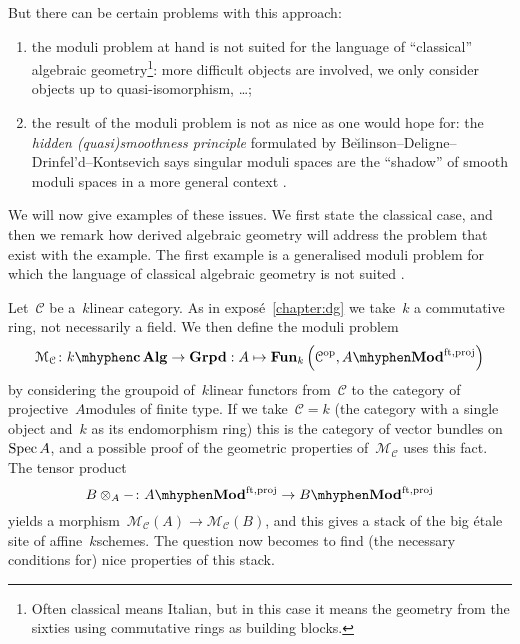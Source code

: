 \begin{refsection}
But there can be certain problems with this approach:
\begin{enumerate}
  \item the moduli problem at hand is not suited for the language of ``classical'' algebraic geometry\footnote{Often classical means Italian, but in this case it means the geometry from the sixties using commutative rings as building blocks.}: more difficult objects are involved, we only consider objects up to quasi-isomorphism, \dots;
  \item the result of the moduli problem is not as nice as one would hope for: the \emph{hidden (quasi)smooth\-ness principle} formulated by Be\u\i linson--Deligne--Drinfel'd--Kontsevich says singular moduli spaces are the ``shadow'' of smooth moduli spaces in a more general context \cite[sections 1.4 and 5.1]{kontsevich-enumeration-of-rational-curves}.
\end{enumerate}
We will now give examples of these issues. We first state the classical case, and then we remark how derived algebraic geometry will address the problem that exist with the example. The first example is a generalised moduli problem for which the language of classical algebraic geometry is not suited \cite[section 1]{toen-vaquie-moduli-of-objects-in-dg-categories}.
\begin{example}
  Let~$\mathcal{C}$ be a~$k$\dash linear category. As in expos\'e~\ref{chapter:dg} we take~$k$ a commutative ring, not necessarily a field. We then define the moduli problem
  \begin{equation}
    \label{equation:moduli-linear-category}
    \mathcal{M}_{\mathcal{C}}\colon k\mhyphen\mathbf{c\,Alg}\to\mathbf{Grpd}:A\mapsto\Fun_k\left( \mathcal{C}^\opp,A\mhyphen\Mod^{\mathrm{ft,proj}} \right)
  \end{equation}
  by considering the groupoid of~$k$\dash linear functors from~$\mathcal{C}$ to the category of projective~$A$\dash modules of finite type. If we take~$\mathcal{C}=k$ (the category with a single object and~$k$ as its endomorphism ring) this is the category of vector bundles on~$\operatorname{Spec} A$, and a possible proof of the geometric properties of~$\mathcal{M}_{\mathcal{C}}$ uses this fact. The tensor product
  \begin{equation}
    B\otimes_A-\colon A\mhyphen\Mod^{\mathrm{ft,proj}}\to B\mhyphen\Mod^{\mathrm{ft,proj}}
  \end{equation}
  yields a morphism~$\mathcal{M}_{\mathcal{C}}(A)\to\mathcal{M}_{\mathcal{C}}(B)$, and this gives a stack of the big \'etale site of affine~$k$\dash schemes. The question now becomes to find (the necessary conditions for) nice properties of this stack.


\end{example}
\end{refsection}
